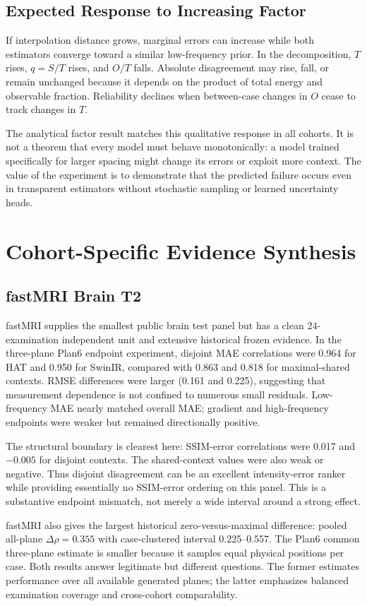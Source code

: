 \documentclass[journal,10pt]{IEEEtran}
\begin{document}
\subsection{Expected Response to Increasing Factor}
If interpolation distance grows, marginal errors can increase while both estimators converge toward a similar low-frequency prior. In the decomposition, $T$ rises, $q=S/T$ rises, and $O/T$ falls. Absolute disagreement may rise, fall, or remain unchanged because it depends on the product of total energy and observable fraction. Reliability declines when between-case changes in $O$ cease to track changes in $T$.

The analytical factor result matches this qualitative response in all cohorts. It is not a theorem that every model must behave monotonically: a model trained specifically for larger spacing might change its errors or exploit more context. The value of the experiment is to demonstrate that the predicted failure occurs even in transparent estimators without stochastic sampling or learned uncertainty heads.

\section{Cohort-Specific Evidence Synthesis}
\subsection{fastMRI Brain T2}
fastMRI supplies the smallest public brain test panel but has a clean 24-examination independent unit and extensive historical frozen evidence. In the three-plane Plan6 endpoint experiment, disjoint MAE correlations were 0.964 for HAT and 0.950 for SwinIR, compared with 0.863 and 0.818 for maximal-shared contexts. RMSE differences were larger (0.161 and 0.225), suggesting that measurement dependence is not confined to numerous small residuals. Low-frequency MAE nearly matched overall MAE; gradient and high-frequency endpoints were weaker but remained directionally positive.

The structural boundary is clearest here: SSIM-error correlations were 0.017 and $-0.005$ for disjoint contexts. The shared-context values were also weak or negative. Thus disjoint disagreement can be an excellent intensity-error ranker while providing essentially no SSIM-error ordering on this panel. This is a substantive endpoint mismatch, not merely a wide interval around a strong effect.

fastMRI also gives the largest historical zero-versus-maximal difference: pooled all-plane $\Delta\rho=0.355$ with case-clustered interval 0.225--0.557. The Plan6 common three-plane estimate is smaller because it samples equal physical positions per case. Both results answer legitimate but different questions. The former estimates performance over all available generated planes; the latter emphasizes balanced examination coverage and cross-cohort comparability.
\end{document}

